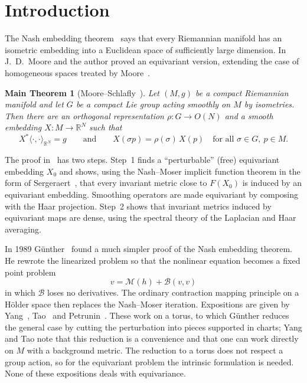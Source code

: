 \documentclass[11pt]{amsart}
\newtheorem*{maintheorem}{Main Theorem}
\theoremstyle{definition}
\newcommand{\R}{\mathbb{R}}
\newcommand{\inner}[2]{\langle #1, #2\rangle}
\newcommand{\cM}{\mathcal{M}}
\newcommand{\cB}{\mathcal{B}}
\begin{document}
\section{Introduction}

The Nash embedding theorem~\cite{Nash56} says that every Riemannian manifold has an isometric
embedding into a Euclidean space of sufficiently large dimension. In~\cite{MS80} J.~D.~Moore and
the author proved an equivariant version, extending the case of homogeneous spaces treated by Moore~\cite{Moore76}.

\begin{maintheorem}[Moore--Schlafly~\cite{MS80}]
Let $(M,g)$ be a compact Riemannian manifold and let $G$ be a compact Lie group acting smoothly on
$M$ by isometries. Then there are an orthogonal representation $\rho\colon G\to O(N)$ and a smooth
embedding $X\colon M\to\R^N$ such that
\[
X^*\inner{\cdot}{\cdot}_{\R^N} = g
\qquad\text{and}\qquad
X(\sigma p) = \rho(\sigma)\,X(p)\quad\text{for all }\sigma\in G,\ p\in M .
\]
\end{maintheorem}

The proof in~\cite{MS80} has two steps. Step~1 finds a ``perturbable'' (free) equivariant embedding
$X_0$ and shows, using the Nash--Moser implicit function theorem in the form of
Sergeraert~\cite{Sergeraert70}, that every invariant metric close to $F(X_0)$ is induced by an
equivariant embedding. Smoothing operators are made equivariant by composing with the Haar
projection. Step~2 shows that invariant metrics induced by equivariant maps are dense, using the
spectral theory of the Laplacian and Haar averaging.

In 1989 G\"unther~\cite{Gunther89,Gunther91} found a much simpler proof of the Nash embedding
theorem. He rewrote the linearized problem so that the nonlinear equation becomes a fixed point
problem
\begin{equation}\label{eq:fixed-point-intro}
v = \cM(h) + \cB(v,v)
\end{equation}
in which $\cB$ loses no derivatives. The ordinary contraction mapping principle on a H\"older space
then replaces the Nash--Moser iteration. Expositions are given by Yang~\cite{Yang98},
Tao~\cite{Tao16} and Petrunin~\cite{Petrunin26}. These work on a torus, to which G\"unther reduces
the general case by cutting the perturbation into pieces supported in charts; Yang and Tao note
that this reduction is a convenience and that one can work directly on $M$ with a background
metric. The reduction to a torus does not respect a group action, so for the equivariant problem
the intrinsic formulation is needed. None of these expositions deals with equivariance.
\end{document}
